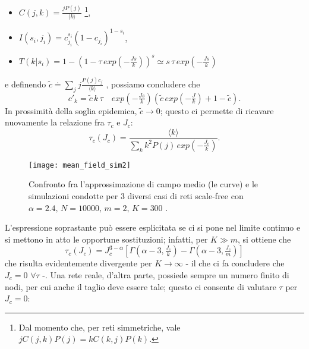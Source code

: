 \begin{itemize}
	\item $ C\left(j,k\right) = \frac{j P\left(j\right)}{\langle k \rangle} $ \footnote{Dal momento che, per reti simmetriche, vale $ j C\left(j,k\right) P\left(j\right) = k C\left(k,j\right) P\left(k\right) $.},
	\item $ I\left(s_i, j_i\right) = c_{j_i}^{s_i} \left(1 - c_{j_i}\right)^{1 - s_i} $,
	\item $ T\left(k|s_i\right) = 1 - \left(1 - \tau \, exp(- \tfrac{J s}{k})\right)^s \simeq s \, \tau \, exp(- \tfrac{J s}{k}) $ 
\end{itemize}
e definendo $ \tilde{c} \doteq \sum_j j \tfrac{P\left(j\right) c_j}{\langle k \rangle} $ \cite{Bagnoli2014}, possiamo concludere che 
\begin{equation}
	c'_k = \tilde{c} \, k \, \tau \quad exp(- \tfrac{J s}{k}) \left(\tilde{c} \, exp(- \tfrac{J}{k}) + 1 - \tilde{c}\right).
\end{equation}
In prossimità della soglia epidemica, $ \tilde{c} \to 0 $; questo ci permette di ricavare nuovamente la relazione fra $ \tau_c $ e $ J_c $:
\begin{equation}
	\tau_c\left(J_c\right) = \frac{\langle k \rangle}{\sum_k k^2 P\left(j\right) \, exp(-\tfrac{J_c}{k})}.
\end{equation}
\begin{figure}[t]
		\begin{center}
			\texttt{[image: mean\_field\_sim2]}
			\caption{Confronto fra l'approssimazione di campo medio (le curve) e le simulazioni condotte per $ 3 $ diversi casi di reti scale-free con $ \alpha = 2.4, \, N = 10000, \, m = 2, \, K = 300 $ \cite{Bagnoli2014} .}
			\label{fig:sim2}
		\end{center}
\end{figure}
L'espressione soprastante può essere esplicitata se ci si pone nel limite continuo e si mettono in atto le opportune sostituzioni; infatti, per $ K \gg m $, si ottiene che
\begin{equation}
	\tau_c \left(J_c \right) = J_{c}^{3 - \alpha} \left[ \Gamma \left( \alpha - 3, \tfrac{J_c}{k} \right) - \Gamma \left( \alpha - 3, \tfrac{J_c}{m}\right) \right] 	 
\end{equation}
che risulta evidentemente divergente per $ K \to \infty $ - il che ci fa concludere che $ J_c = 0$ $\forall \tau$ -. Una rete reale, d'altra parte, possiede sempre un numero finito di nodi, per cui anche il taglio deve essere tale; questo ci consente di valutare $ \tau $ per $ J_c = 0 $:

